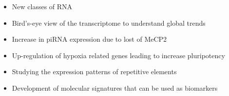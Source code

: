 \begin{itemize}
   \item New classes of RNA
   \item Bird’s-eye view of the transcriptome to understand global trends
   \item Increase in piRNA expression due to lost of MeCP2
   \item Up-regulation of hypoxia related genes leading to increase pluripotency
   \item Studying the expression patterns of repetitive elements
   \item Development of molecular signatures that can be used as biomarkers
\end{itemize}
